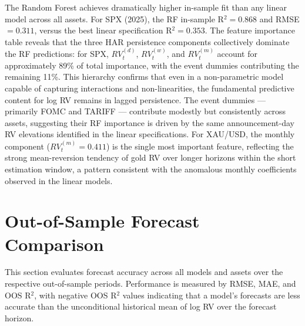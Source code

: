 \documentclass[12pt,a4paper]{report}
\begin{document}
The Random Forest achieves dramatically higher in-sample fit than any linear model across all assets. For SPX (2025), the RF in-sample R$^2 = 0.868$ and RMSE $= 0.311$, versus the best linear specification R$^2 = 0.353$. The feature importance table reveals that the three HAR persistence components collectively dominate the RF predictions: for SPX, $RV_t^{(d)}$, $RV_t^{(w)}$, and $RV_t^{(m)}$ account for approximately 89\% of total importance, with the event dummies contributing the remaining 11\%. This hierarchy confirms that even in a non-parametric model capable of capturing interactions and non-linearities, the fundamental predictive content for log RV remains in lagged persistence. The event dummies --- primarily FOMC and TARIFF --- contribute modestly but consistently across assets, suggesting their RF importance is driven by the same announcement-day RV elevations identified in the linear specifications. For XAU/USD, the monthly component ($RV_t^{(m)} = 0.411$) is the single most important feature, reflecting the strong mean-reversion tendency of gold RV over longer horizons within the short estimation window, a pattern consistent with the anomalous monthly coefficients observed in the linear models.

\section{Out-of-Sample Forecast Comparison}

This section evaluates forecast accuracy across all models and assets over the respective out-of-sample periods. Performance is measured by RMSE, MAE, and OOS R$^2$, with negative OOS R$^2$ values indicating that a model's forecasts are less accurate than the unconditional historical mean of log RV over the forecast horizon.
\end{document}
